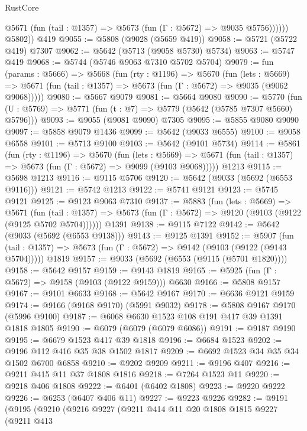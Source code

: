 \begin{lexlean}{RustCore}
\begin{coremodule}
              @5671 (fun (tail : @1357) => @5673 (fun (Γ : @5672) => @9035 @5756))))))
        @5802))
    @419
@9055 := @5808 (@9028 (@5659 @419))
@9058 := @5721 (@5722 @419) @7307
@9062 := @5642 (@5713 (@9058 @5730) @5734)
@9063 := @5747 @419
@9068 := @5744 (@5746 @9063 @7310 @5702 @5704)
@9079 := fun (params : @5666) =>
  @5668
    (fun (rty : @1196) =>
    @5670
      (fun (lets : @5669) =>
      @5671 (fun (tail : @1357) => @5673 (fun (Γ : @5672) => @9035 (@9062 @9068)))))
@9080 := @5667 @9079
@9081 := @5664 @9080
@9090 := @5770 (fun (U : @5769) => @5771 (fun (t : @7) => @5779 (@5642 (@5785 @7307 @5660) @5796)))
@9093 := @9055 (@9081 @9090) @7305
@9095 := @5855 @9080 @9090
@9097 := @5858 @9079 @1436
@9099 := @5642 (@9033 @6555)
@9100 := @9058 @6558
@9101 := @5713 @9100
@9103 := @5642 (@9101 @5734)
@9114 := @5861
    (fun (rty : @1196) =>
    @5670
      (fun (lets : @5669) =>
      @5671 (fun (tail : @1357) => @5673 (fun (Γ : @5672) => @9099 (@9103 @9068)))))
    @1213
@9115 := @5698 @1213
@9116 := @9115 @5706
@9120 := @5642 (@9033 (@5692 (@6553 @9116)))
@9121 := @5742 @1213
@9122 := @5741 @9121
@9123 := @5745 @9121
@9125 := @9123 @9063 @7310
@9137 := @5883
    (fun (lets : @5669) =>
    @5671
      (fun (tail : @1357) => @5673 (fun (Γ : @5672) => @9120 (@9103 (@9122 (@9125 @5702 @5704))))))
    @1391
@9138 := @9115 @7122
@9142 := @5642 (@9033 (@5692 (@6553 @9138)))
@9143 := @9125 @1391
@9152 := @5907
    (fun (tail : @1357) => @5673 (fun (Γ : @5672) => @9142 (@9103 (@9122 (@9143 @5704)))))
    @1819
@9157 := @9033 (@5692 (@6553 (@9115 (@5701 @1820))))
@9158 := @5642 @9157
@9159 := @9143 @1819
@9165 := @5925 (fun (Γ : @5672) => @9158 (@9103 (@9122 @9159))) @6630
@9166 := @5808 @9157
@9167 := @9101 @6633
@9168 := @5642 @9167
@9170 := @6636 @9121 @9159
@9174 := @9166 (@9168 @9170) (@5991 @9032)
@9178 := @5808 @9167 @9170 (@5996 @9100)
@9187 := @6068 @6630 @1523 @108 @191 @417 @39 @1391 @1818 @1805
@9190 := @6079 (@6079 (@6079 @6086))
@9191 := @9187 @9190
@9195 := @6679 @1523 @417 @39 @1818
@9196 := @6684 @1523
@9202 := @9196 @112 @416 @35 @38 @1502 @1817
@9209 := @6692 @1523 @34 @35 @34 @1502 @6700 @6858
@9210 := @9202 @9209
@9211 := @9196 @407
@9216 := @9211 @415 @11 @37 @1808 @1816
@9218 := @7264 @1523 @11
@9220 := @9218 @406 @1808
@9222 := @6401 (@6402 @1808)
@9223 := @9220 @9222
@9226 := @6253 (@6407 @406 @11)
@9227 := @9223 @9226
@9282 := @9191
    (@9195
      (@9210
        (@9216
          @9227
          (@9211
            @414
            @11
            @20
            @1808
            @1815
            @9227
            (@9211
              @413

\end{coremodule}
\end{lexlean}
